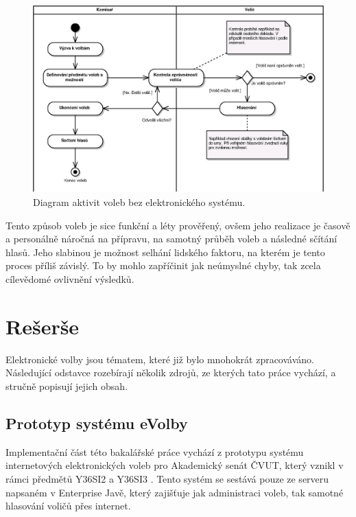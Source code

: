 \documentclass[11pt,twoside,a4paper]{book}
\begin{document}
\begin{figure}[h]
	\centering
	\includegraphics[scale=0.9]{diagrams/soucasny_stav.eps}
	\caption{Diagram aktivit voleb bez elektronického systému.}
	\label{fig:soucasny_stav}
\end{figure}

Tento způsob voleb je sice funkční a léty prověřený, ovšem jeho realizace je časově a personálně náročná na přípravu, na samotný průběh voleb a následné sčítání hlasů. Jeho slabinou je možnost selhání lidského faktoru, na kterém je tento proces příliš závislý. To by mohlo zapříčinit jak neúmyslné chyby, tak zcela cílevědomé ovlivnění výsledků.

\section{Rešerše} 

Elektronické volby jsou tématem, které již bylo mnohokrát zpracováváno. Následující odstavce rozebírají několik zdrojů, ze kterých tato práce vychází, a stručně popisují jejich obsah.

\subsection{Prototyp systému eVolby} \label{sec:prototyp}

Implementační část této bakalářské práce vychází z prototypu systému internetových elektronických voleb pro Akademický senát ČVUT, který vznikl v rámci předmětů Y36SI2 a Y36SI3 \cite{www:prototyp}. Tento systém se sestává pouze ze serveru napsaném v Enterprise Javě, který zajišťuje jak administraci voleb, tak samotné hlasování voličů přes internet. 
\end{document}
